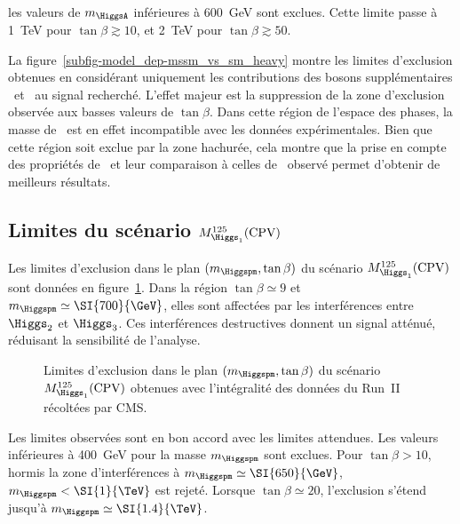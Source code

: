 les valeurs de $m_{\HiggsA}$ inférieures à \SI{600}{\GeV} sont exclues.
Cette limite passe à \SI{1}{\TeV} pour $\tan\beta\gtrsim\num{10}$,
et \SI{2}{\TeV} pour $\tan\beta\gtrsim\num{50}$.
\par
La figure~\ref{subfig-model_dep-mssm_vs_sm_heavy} montre les limites d'exclusion obtenues
en considérant uniquement les contributions des bosons supplémentaires \Higgs\ et \HiggsA\ au signal recherché.
L'effet majeur est la suppression de la zone d'exclusion observée aux basses valeurs de $\tan\beta$.
Dans cette région de l'espace des phases, la masse de \higgsMSSM\ est en effet incompatible avec les données expérimentales.
Bien que cette région soit exclue par la zone hachurée,
cela montre que la prise en compte des propriétés de \higgsMSSM\
et leur comparaison à celles de \higgs\ observé permet d'obtenir de meilleurs résultats.
\subsection{Limites du scénario $M_{\Higgs_1}^{125}(\text{CPV})$}
Les limites d'exclusion dans le plan $(m_{\Higgspm},\tan\beta)$ du scénario $M_{\Higgs_1}^{125}(\text{CPV})$
sont données en figure~\ref{fig-model_dep-CPV}.
Dans la région $\tan\beta\simeq\num{9}$ et $m_{\Higgspm}\simeq\SI{700}{\GeV}$,
elles sont affectées par les interférences entre $\Higgs_2$ et $\Higgs_3$.
Ces interférences destructives donnent un signal atténué, réduisant la sensibilité de l'analyse.
\begin{figure}[h]
\centering


\caption[Limites d'exclusion du scénario $M_{\Higgs_1}^{125}(\text{CPV})$.]{Limites d'exclusion dans le plan $(m_{\Higgspm},\tan\beta)$ du scénario $M_{\Higgs_1}^{125}(\text{CPV})$ obtenues avec l'intégralité des données du Run~II récoltées par CMS.}
\label{fig-model_dep-CPV}
\end{figure}
\par
Les limites observées sont en bon accord avec les limites attendues.
Les valeurs inférieures à \SI{400}{\GeV} pour la masse $m_{\Higgspm}$ sont exclues.
Pour $\tan\beta>\num{10}$,
hormis la zone d'interférences à $m_{\Higgspm} \simeq \SI{650}{\GeV}$,
$m_{\Higgspm} < \SI{1}{\TeV}$ est rejeté.
Lorsque
$\tan\beta\simeq\num{20}$,
l'exclusion s'étend jusqu'à
$m_{\Higgspm} \simeq \SI{1.4}{\TeV}$.

